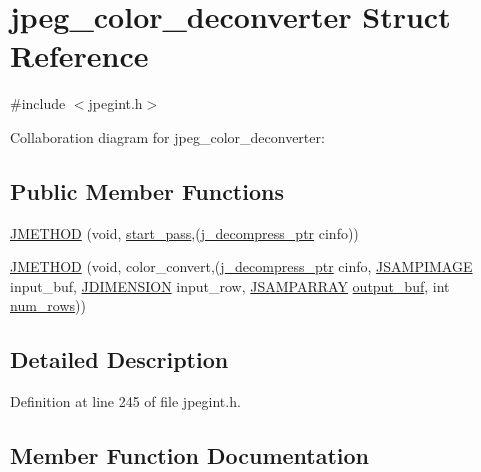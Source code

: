 \hypertarget{structjpeg__color__deconverter}{}\section{jpeg\+\_\+color\+\_\+deconverter Struct Reference}
\label{structjpeg__color__deconverter}


{\ttfamily \#include $<$jpegint.\+h$>$}



Collaboration diagram for jpeg\+\_\+color\+\_\+deconverter\+:
\subsection*{Public Member Functions}
\begin{DoxyCompactItemize}
\item 
\mbox{\hyperlink{structjpeg__color__deconverter_a90ddfc502a2aadc44f157007a3e49056}{J\+M\+E\+T\+H\+OD}} (void, \mbox{\hyperlink{jddctmgr_8c_a1964f006adb8fb80f57e455f6452aec1}{start\+\_\+pass}},(\mbox{\hyperlink{jpeglib_8h_a00c7d78af44bd26a901c791ccfc1e178}{j\+\_\+decompress\+\_\+ptr}} cinfo))
\item 
\mbox{\hyperlink{structjpeg__color__deconverter_ab0fedad382d6b40b3698181271bb4ba4}{J\+M\+E\+T\+H\+OD}} (void, color\+\_\+convert,(\mbox{\hyperlink{jpeglib_8h_a00c7d78af44bd26a901c791ccfc1e178}{j\+\_\+decompress\+\_\+ptr}} cinfo, \mbox{\hyperlink{jpeglib_8h_a4bf858e4d42202287e786bdec2f3b62b}{J\+S\+A\+M\+P\+I\+M\+A\+GE}} input\+\_\+buf, \mbox{\hyperlink{jmorecfg_8h_a04ed4674f6f1d0d50ec241531e38274f}{J\+D\+I\+M\+E\+N\+S\+I\+ON}} input\+\_\+row, \mbox{\hyperlink{jpeglib_8h_ac9d5d1b829ed51769db69a37271a7e91}{J\+S\+A\+M\+P\+A\+R\+R\+AY}} \mbox{\hyperlink{jdct_8h_ad7e4660a191b1a791748dd44d5a7a0ec}{output\+\_\+buf}}, int \mbox{\hyperlink{jpegint_8h_ac5f8b57092da0f421713ba171c4c9f87}{num\+\_\+rows}}))
\end{DoxyCompactItemize}


\subsection{Detailed Description}


Definition at line 245 of file jpegint.\+h.



\subsection{Member Function Documentation}
\mbox{\label{structjpeg__color__deconverter_a90ddfc502a2aadc44f157007a3e49056}} 
